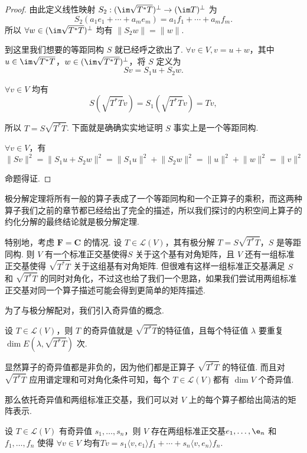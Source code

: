 \begin{proof}
    由此定义线性映射 $ S_2: (\im \sqrt{T^*T})^{\perp} \rightarrow (\im T)^{\perp} $ 为
    \[ S_2(a_1e_1 + \cdots + a_me_m) = a_1f_1 + \cdots + a_mf_m. \]
    所以 $ \forall w \in (\im \sqrt{T^*T})^{\perp} $ 均有 $ \lVert S_2w \rVert = \lVert w \rVert $.

    到这里我们想要的等距同构 $ S $ 就已经呼之欲出了. $ \forall v \in V, v = u + w $，其中 $ u \in \im \sqrt{T^*T} $，$ w \in (\im \sqrt{T^*T})^{\perp} $，将 $ S $ 定义为
    \[ Sv = S_1u + S_2w. \]

    $ \forall v \in V $ 均有
    \[ S(\sqrt{T^*T}v) = S_1(\sqrt{T^*T}v) = Tv, \]

    所以 $ T = S\sqrt{T^*T} $. 下面就是确确实实地证明 $ S $ 事实上是一个等距同构.

    $ \forall v \in V $，有
    \[ \lVert Sv \rVert^2 = \lVert S_1u + S_2w \rVert^2     = \lVert S_1u \rVert^2 + \lVert S_2w \rVert^2 = \lVert u \rVert^2 + \lVert w \rVert^2 = \lVert v \rVert^2 \]

    命题得证.
\end{proof}

极分解定理将所有一般的算子表成了一个等距同构和一个正算子的乘积，而这两种算子我们之前的章节都已经给出了完全的描述，所以我们探讨的内积空间上算子的约化分解的最终结论就是极分解定理.

特别地，考虑 $ \mathbf{F} = \mathbf{C} $ 的情况. 设 $ T \in \mathcal{L}(V) $，其有极分解 $ T = S\sqrt{T^*T} $，$ S $ 是等距同构. 则 $ V $ 有一个标准正交基使得$ S $ 关于这个基有对角矩阵，且 $ V $ 还有一组标准正交基使得 $ \sqrt{T^*T} $ 关于这组基有对角矩阵. 但很难有这样一组标准正交基满足 $ S $ 和 $ \sqrt{T^*T} $ 的同时对角化，不过这也给了我们一个思路，如果我们尝试用两组标准正交基对同一个算子描述可能会得到更简单的矩阵描述.

为了与极分解配对，我们引入奇异值的概念.

\begin{definition}
    设 $ T \in \mathcal{L}(V) $，则 $ T $ 的奇异值就是 $ \sqrt{T^*T} $的特征值，且每个特征值 $ \lambda $ 要重复 $ \dim E(\lambda, \sqrt{T^*T}) $ 次.
\end{definition}

显然算子的奇异值都是非负的，因为他们都是正算子 $ \sqrt{T^*T} $ 的特征值. 而且对 $ \sqrt{T^*T} $ 应用谱定理和可对角化条件可知，每个 $ T \in \mathcal{L}(V) $都有 $ \dim V $ 个奇异值.

那么依托奇异值和两组标准正交基，我们可以对 $ V $ 上的每个算子都给出简洁的矩阵表示.

\begin{theorem}
    设 $ T \in \mathcal{L}(V) $ 有奇异值 $ s_1, \ldots , s_n $，则 $ V $ 存在两组标准正交基$ e_1, \ldots, \e_n $ 和 $ f_1, \ldots, f_n $ 使得 $ \forall v \in V $ 均有$ Tv = s_1 \langle v, e_1 \rangle f_1 + \cdots + s_n \langle v, e_n \rangle f_n $.
\end{theorem}

